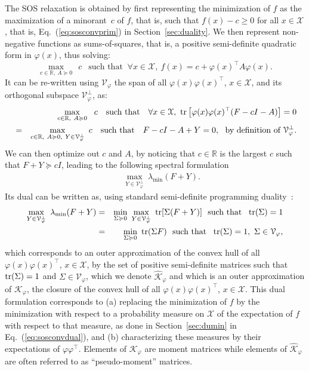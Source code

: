 \documentclass[11pt]{article}
\newcommand{\BEA}{\begin{eqnarray}}
\newcommand{\EEA}{\end{eqnarray}}
\newcommand{\BEQ}{\begin{equation}}
\newcommand{\EEQ}{\end{equation}}
\newcommand{\tr}{\mathop{ \rm tr}}
\newcommand{\idm}{I}
\newcommand{\rb}{\mathbb{R}}
\newcommand{\mysec}[1]{Section~\ref{sec:#1}}
\newcommand{\eq}[1]{Eq.~(\ref{eq:#1})}
\def \X{{\mathcal X}}
\def \K{{\mathcal K}}
\begin{document}
The SOS relaxation is obtained by first representing the minimization of $f$ as the maximization of a minorant~$c$ of $f$, that is, such that $f(x)-c \geqslant 0$ for all $x\in \X$, that is, \eq{sosconvprim} in \mysec{duality}. We then represent non-negative functions as sums-of-squares, that is, a positive semi-definite quadratic form in $\varphi(x)$,  thus solving:
\BEQ
\label{eq:primalc}
 \max_{c \in \rb, \ A \succcurlyeq 0 } \ \ c   \ \  \mbox{ such that }\   \forall x \in \X, \ f(x) = c + \varphi(x)^\top A \varphi(x).
\EEQ
It can be re-written using $\mathcal{V}_\varphi$ the span of all $\varphi(x) \varphi(x)^\top$, $ x \in \X$, and its orthogonal subspace $\mathcal{V}_\varphi^\perp$, as:
\BEA
\notag & &  \max_{c \in \rb, \ A \succcurlyeq 0 } \ \ c  \ \ \mbox{ such that }\ \ \forall x \in \X, \ \tr \big[ \varphi(x) \varphi(x)^\top ( F - c \idm - A) \big] = 0 \\
\notag & = & \max_{c \in \rb, \ A \succcurlyeq 0, \ Y \in   \mathcal{V}_\varphi^\perp } \  c \  \ \mbox{ such that }\ \  F - c \idm - A + Y = 0 , \ \mbox{ by definition of } \mathcal{V}_\varphi^\perp.
\EEA
We can then optimize out $c$ and $A$, by noticing that $c \in\rb$ is the largest $c$ such that $F + Y \succcurlyeq c \idm$, leading to the following spectral formulation
\BEA
\label{eq:primalSOS} &   & \max_{Y \in  \mathcal{V}_\varphi^\perp }\   \lambda_{\min}(F + Y).
\EEA
Its dual can be written as, using standard semi-definite programming duality~\cite{Boyd2004Convex}:
\BEA
\notag \max_{Y \in  \mathcal{V}_\varphi^\perp }\   \lambda_{\min}(F + Y)
\notag  & = & \min_{ \Sigma \succcurlyeq 0 } \ 
\max_{Y \in  \mathcal{V}_\varphi^\perp }\   \tr [ \Sigma(F + Y)] \ \mbox{ such that } \ \tr(\Sigma) = 1 \\
\label{eq:dualSOS} & = & \min_{ \Sigma \succcurlyeq 0 } \ 
   \tr ( \Sigma F )\ \mbox{ such that } \ \tr(\Sigma) = 1 , \ \Sigma \in \mathcal{V}_\varphi,
\EEA
which corresponds to an outer approximation of the convex hull of all $\varphi(x)\varphi(x)^\top$, $x \in \X$, by the set of positive semi-definite matrices such that 
$\tr(\Sigma) = 1$ and $\Sigma \in \mathcal{V}_\varphi$, which we denote $\widehat{\K}_\varphi$ and  which is an outer approximation of $\K_\varphi$, the closure of the convex hull of all $\varphi(x)\varphi(x)^\top$, $x \in \X$. This dual formulation corresponds to (a) replacing the minimization of $f$ by the minimization with respect to a probability measure on $\X$ of the expectation of $f$ with respect to that measure, as done in \mysec{dumin} in \eq{sosconvdual}, and (b) characterizing these measures by their expectations of $\varphi \varphi^\top$. Elements of $\K_\varphi$ are moment matrices while elements of $\widehat{\K}_\varphi$ are often referred to as ``pseudo-moment'' matrices.
  
\end{document}
